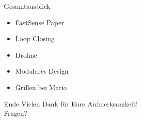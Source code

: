 \documentclass{beamer}
\begin{document}
\begin{frame}{Gesamtausblick}
\begin{itemize}
\item{FastSense Paper}
\item{Loop Closing}
\item{Drohne}
\item{Modulares Design}
\item{Grillen bei Mario}
\end{itemize}
\end{frame}

\begin{frame}{Ende}
\centering\LARGE
Vielen Dank für Eure Aufmerksamkeit!\\\vspace{1cm}
Fragen?
\end{frame}
\end{document}
